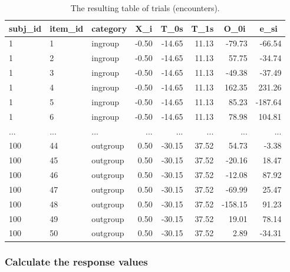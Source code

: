 \documentclass[english,doc,floatsintext]{apa6}
\begin{document}
\begin{table}[H]

\begin{center}
\begin{threeparttable}

\caption{\label{tab:trials-table}The resulting table of trials (encounters).}

\begin{tabular}{lllrrrrr}
\toprule
subj\_id & \multicolumn{1}{c}{item\_id} & \multicolumn{1}{c}{category} & \multicolumn{1}{c}{X\_i} & \multicolumn{1}{c}{T\_0s} & \multicolumn{1}{c}{T\_1s} & \multicolumn{1}{c}{O\_0i} & \multicolumn{1}{c}{e\_si}\\
\midrule
1 & 1 & ingroup & -0.50 & -14.65 & 11.13 & -79.73 & -66.54\\
1 & 2 & ingroup & -0.50 & -14.65 & 11.13 & 57.75 & -34.74\\
1 & 3 & ingroup & -0.50 & -14.65 & 11.13 & -49.38 & -37.49\\
1 & 4 & ingroup & -0.50 & -14.65 & 11.13 & 162.35 & 231.26\\
1 & 5 & ingroup & -0.50 & -14.65 & 11.13 & 85.23 & -187.64\\
1 & 6 & ingroup & -0.50 & -14.65 & 11.13 & 78.98 & 104.81\\
... & ... & ... & ... & ... & ... & ... & ...\\
100 & 44 & outgroup & 0.50 & -30.15 & 37.52 & 54.73 & -3.38\\
100 & 45 & outgroup & 0.50 & -30.15 & 37.52 & -20.16 & 18.47\\
100 & 46 & outgroup & 0.50 & -30.15 & 37.52 & -12.08 & 87.92\\
100 & 47 & outgroup & 0.50 & -30.15 & 37.52 & -69.99 & 25.47\\
100 & 48 & outgroup & 0.50 & -30.15 & 37.52 & -158.15 & 91.23\\
100 & 49 & outgroup & 0.50 & -30.15 & 37.52 & 19.01 & 78.14\\
100 & 50 & outgroup & 0.50 & -30.15 & 37.52 & 2.89 & -34.31\\
\bottomrule
\end{tabular}

\end{threeparttable}
\end{center}

\end{table}

\hypertarget{calculate-the-response-values}{%
\subsubsection{Calculate the response values}\label{calculate-the-response-values}}
\end{document}

